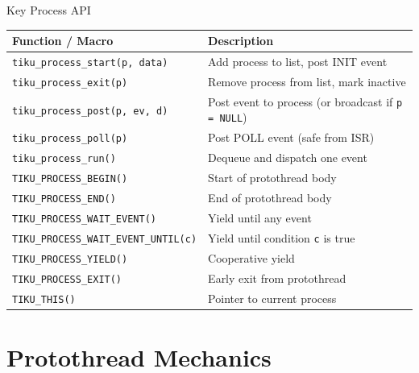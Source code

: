 \documentclass[aspectratio=169, 10pt]{beamer}
\begin{document}
\begin{frame}[fragile]{Key Process API}
\begin{table}
\centering
\small
\begin{tabular}{@{}lp{8cm}@{}}
\toprule
\textbf{Function / Macro} & \textbf{Description} \\
\midrule
\texttt{tiku\_process\_start(p, data)}  & Add process to list, post INIT event \\
\texttt{tiku\_process\_exit(p)}         & Remove process from list, mark inactive \\
\texttt{tiku\_process\_post(p, ev, d)}  & Post event to process (or broadcast if \texttt{p = NULL}) \\
\texttt{tiku\_process\_poll(p)}         & Post POLL event (safe from ISR) \\
\texttt{tiku\_process\_run()}           & Dequeue and dispatch one event \\
\midrule
\texttt{TIKU\_PROCESS\_BEGIN()}         & Start of protothread body \\
\texttt{TIKU\_PROCESS\_END()}           & End of protothread body \\
\texttt{TIKU\_PROCESS\_WAIT\_EVENT()}   & Yield until any event \\
\texttt{TIKU\_PROCESS\_WAIT\_EVENT\_UNTIL(c)} & Yield until condition \texttt{c} is true \\
\texttt{TIKU\_PROCESS\_YIELD()}         & Cooperative yield \\
\texttt{TIKU\_PROCESS\_EXIT()}          & Early exit from protothread \\
\texttt{TIKU\_THIS()}                   & Pointer to current process \\
\bottomrule
\end{tabular}
\end{table}
\end{frame}

\section{Protothread Mechanics}
\end{document}
